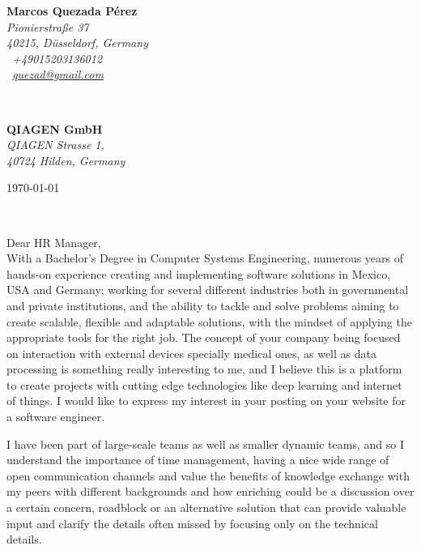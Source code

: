 \documentclass[a4paper,nonstopmode,9.5pt]{article}
\renewcommand{\sffamily}{\rmfamily}
\begin{document}
\sffamily   %
\hfill%
\begin{minipage}[t]{.6\textwidth}
\raggedleft%
{\bfseries Marcos Quezada Pérez}\\[.35ex]
\small\itshape%
Pionierstraße 37\\
40215, Düsseldorf, Germany\\[.35ex]
\Telefon~+49015203136012\\
\Letter~\href{mailto:quezad@gmail.com}{quezad@gmail.com}
\end{minipage}\\[1em]
%
\begin{minipage}[t]{.4\textwidth}
\raggedright%
{\bfseries QIAGEN GmbH}\\[.35ex]
\small\itshape%
QIAGEN Strasse 1,\\
40724 Hilden, Germany
\end{minipage}
\hfill %
\begin{minipage}[t]{.4\textwidth}
\raggedleft %
\today
\end{minipage}\\[2em]
\raggedright
Dear HR Manager,\\[1.5em]
%
With a Bachelor’s Degree in Computer Systems Engineering, numerous years of hands-on experience creating and implementing software solutions in Mexico, USA and Germany; working for several different industries both in governmental and private institutions,
and the ability to tackle and solve problems aiming to create scalable, flexible and adaptable solutions, with the mindset of applying the appropriate tools for the right job. The concept of your company being focused on interaction with external devices specially medical ones, as well as data processing is something really interesting to me, 
and I believe this is a platform to create projects with cutting edge technologies like deep learning and internet of things. I would like to express my interest in your posting on your website for a software engineer.

I have been part of large-scale teams as well as smaller dynamic teams, and so I understand the importance of time management, having a nice wide range of open communication channels and value the benefits of knowledge exchange with my peers with different backgrounds 
and how enriching could be a discussion over a certain concern, roadblock or an alternative solution that can provide valuable input and clarify the details often missed by focusing only on the technical details. 
\end{document}
